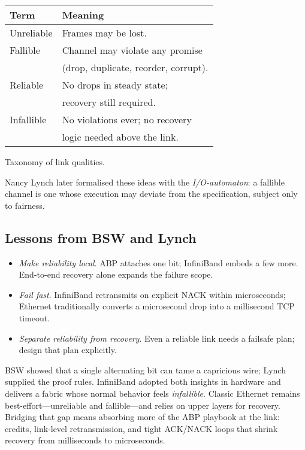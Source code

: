 \begin{marginfigure}
  \footnotesize
  \centering
  \begin{tabular}{@{}l@{~}l@{}}
    \toprule
    Term & Meaning\\
    \midrule
    Unreliable & Frames may be lost.\\
    Fallible   & Channel may violate any promise\\
               & (drop, duplicate, reorder, corrupt).\\
    Reliable   & No drops in steady state;\\
               & recovery still required.\\
    Infallible & No violations ever; no recovery\\
               & logic needed above the link.\\
    \bottomrule
  \end{tabular}
  \caption{Taxonomy of link qualities.\label{tab:taxonomy}}
\end{marginfigure}

Nancy Lynch later formalised these ideas with the
\emph{I/O-automaton}: a fallible channel is one whose execution may
deviate from the specification, subject only to fairness.

\subsection{Lessons from BSW and Lynch}

\begin{itemize}
\item \emph{Make reliability local}.  ABP attaches one bit; InfiniBand embeds
      a few more.  End-to-end recovery alone expands the failure scope.
\item \emph{Fail fast}.  InfiniBand retransmits on explicit NACK within
      microseconds; Ethernet traditionally converts a microsecond drop into a
      millisecond TCP timeout.
\item \emph{Separate reliability from recovery}.  Even a reliable link needs
      a failsafe plan; design that plan explicitly.
\end{itemize}

\begin{highlightbox}[]
\noindent
BSW showed that a single alternating bit can tame a capricious wire; Lynch
supplied the proof rules.  InfiniBand adopted both insights in hardware and
delivers a fabric whose normal behavior feels \emph{infallible}.  Classic
Ethernet remains best-effort---unreliable and fallible---and relies on upper
layers for recovery.  Bridging that gap means absorbing more of the ABP
playbook at the link: credits, link-level retransmission, and tight ACK/NACK
loops that shrink recovery from milliseconds to microseconds.
\end{highlightbox}

